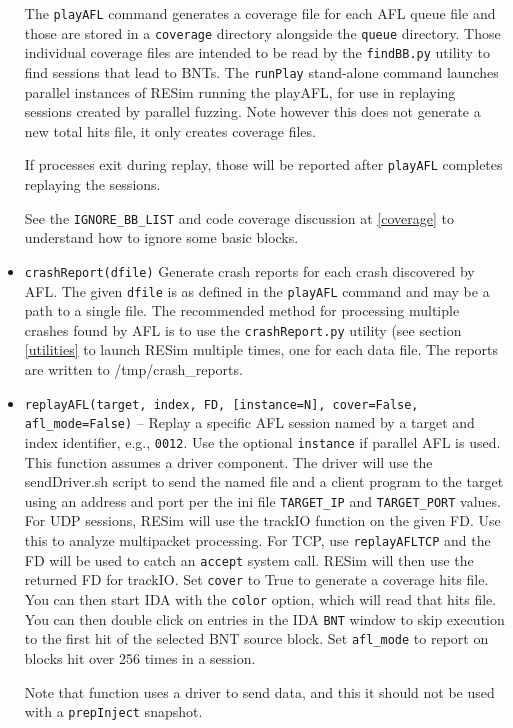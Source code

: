 \documentclass[titlepage]{article}
\begin{document}
\begin{itemize}
The {\tt playAFL} command generates a coverage file for each AFL queue file and those are stored in a {\tt coverage} directory alongside the {\tt queue} directory.
Those individual coverage files are intended to be read by the {\tt findBB.py} utility to find sessions that lead to BNTs.  
The {\tt runPlay} stand-alone command launches parallel instances of RESim running the playAFL, for use in replaying sessions created by parallel fuzzing.  Note however this 
does not generate a new total hits file, it only creates coverage files.  

If processes exit during replay, those will be reported after {\tt playAFL} completes replaying the sessions.

See the {\tt IGNORE\_BB\_LIST} and code coverage discussion at \ref{coverage} to understand how to ignore some basic blocks.

\item{\tt crashReport(dfile)} Generate crash reports for each crash discovered by AFL.  The given {\tt dfile} is as defined in the {\tt playAFL} command and may
be a path to a single file.  The recommended method for processing multiple crashes found by AFL is to use the {\tt crashReport.py} utility (see section \ref{utilities} to launch RESim multiple times,
one for each data file.  The reports are written to /tmp/crash\_reports.

\item{\tt replayAFL(target, index, FD, [instance=N], cover=False, afl\_mode=False)} -- Replay a specific AFL session named by a target and index identifier, e.g., {\tt 0012}.  Use the optional {\tt instance} if parallel AFL is used.  This function assumes a driver component. The driver will use the sendDriver.sh script to send the named file and
a client program to the target using an address and port per the ini file {\tt TARGET\_IP} and {\tt TARGET\_PORT} values.  For UDP sessions, RESim will use the trackIO function on the given FD.  Use this to analyze multipacket processing.  For TCP, use {\tt replayAFLTCP} and the FD will be used to catch an {\tt accept} system call.  RESim will then use the returned FD for trackIO.  Set {\tt cover} to True to generate a coverage hits file.  You can then start IDA with the {\tt color} option, which
will read that hits file.   You can then double click on entries in the IDA {\tt BNT} window to skip execution to the first hit of the selected BNT source block.
Set {\tt afl\_mode} to report on blocks hit over 256 times in a session.

Note that function uses a driver to send data, and this it should not be used with a {\tt prepInject} snapshot.


\end{itemize}
\end{document}
